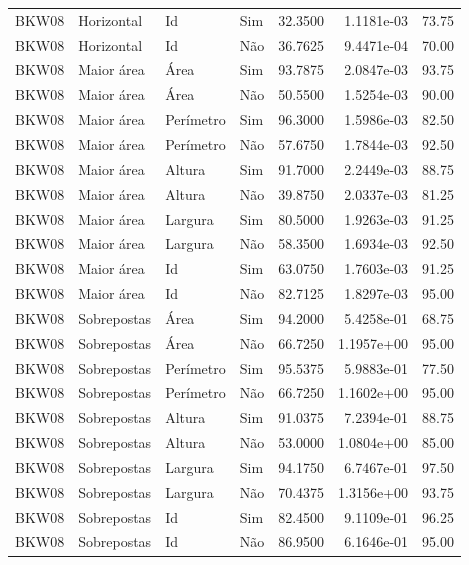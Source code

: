 \begin{tabular}{llllrrr}
    BKW08     & Horizontal  & Id        & Sim         & 32.3500      & 1.1181e-03 & 73.75    \\
    BKW08     & Horizontal  & Id        & Não         & 36.7625      & 9.4471e-04 & 70.00    \\
    BKW08     & Maior área  & Área      & Sim         & 93.7875      & 2.0847e-03 & 93.75    \\
    BKW08     & Maior área  & Área      & Não         & 50.5500      & 1.5254e-03 & 90.00    \\
    BKW08     & Maior área  & Perímetro & Sim         & 96.3000      & 1.5986e-03 & 82.50    \\
    BKW08     & Maior área  & Perímetro & Não         & 57.6750      & 1.7844e-03 & 92.50    \\
    BKW08     & Maior área  & Altura    & Sim         & 91.7000      & 2.2449e-03 & 88.75    \\
    BKW08     & Maior área  & Altura    & Não         & 39.8750      & 2.0337e-03 & 81.25    \\
    BKW08     & Maior área  & Largura   & Sim         & 80.5000      & 1.9263e-03 & 91.25    \\
    BKW08     & Maior área  & Largura   & Não         & 58.3500      & 1.6934e-03 & 92.50    \\
    BKW08     & Maior área  & Id        & Sim         & 63.0750      & 1.7603e-03 & 91.25    \\
    BKW08     & Maior área  & Id        & Não         & 82.7125      & 1.8297e-03 & 95.00    \\
    BKW08     & Sobrepostas & Área      & Sim         & 94.2000      & 5.4258e-01 & 68.75    \\
    BKW08     & Sobrepostas & Área      & Não         & 66.7250      & 1.1957e+00 & 95.00    \\
    BKW08     & Sobrepostas & Perímetro & Sim         & 95.5375      & 5.9883e-01 & 77.50    \\
    BKW08     & Sobrepostas & Perímetro & Não         & 66.7250      & 1.1602e+00 & 95.00    \\
    BKW08     & Sobrepostas & Altura    & Sim         & 91.0375      & 7.2394e-01 & 88.75    \\
    BKW08     & Sobrepostas & Altura    & Não         & 53.0000      & 1.0804e+00 & 85.00    \\
    BKW08     & Sobrepostas & Largura   & Sim         & 94.1750      & 6.7467e-01 & 97.50    \\
    BKW08     & Sobrepostas & Largura   & Não         & 70.4375      & 1.3156e+00 & 93.75    \\
    BKW08     & Sobrepostas & Id        & Sim         & 82.4500      & 9.1109e-01 & 96.25    \\
    BKW08     & Sobrepostas & Id        & Não         & 86.9500      & 6.1646e-01 & 95.00    \\
    \hline
\end{tabular}